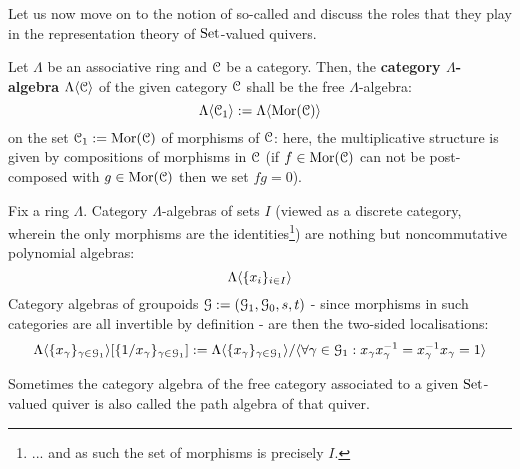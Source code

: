             Let us now move on to the notion of so-called  and discuss the roles that they play in the representation theory of $\mathrm{Set}$-valued quivers. 
            \begin{definition} \label{def: category_algebras}
                Let $\Lambda$ be an associative ring and $\mathcal{C}$ be a category. Then, the \textbf{category $\Lambda$-algebra} $\Lambda\langle\mathcal{C}\rangle$ of the given category $\mathcal{C}$ shall be the free $\Lambda$-algebra:
                    $$\Lambda\langle\mathcal{C}_1\rangle := \Lambda\langle\mathrm{Mor}(\mathcal{C})\rangle$$
                on the set $\mathcal{C}_1 := \mathrm{Mor}(\mathcal{C})$ of morphisms of $\mathcal{C}$: here, the multiplicative structure is given by compositions of morphisms in $\mathcal{C}$ (if $f\in \mathrm{Mor}(\mathcal{C})$ can not be post-composed with $g \in \mathrm{Mor}(\mathcal{C})$ then we set $fg = 0$).
            \end{definition}
            \begin{example}
                Fix a ring $\Lambda$. Category $\Lambda$-algebras of sets $I$ (viewed as a discrete category, wherein the only morphisms are the identities\footnote{... and as such the set of morphisms is precisely $I$.}) are nothing but noncommutative polynomial algebras:
                    $$\Lambda\langle\{x_i\}_{i \in I}\rangle$$
                Category algebras of groupoids $\mathcal{G} := (\mathcal{G}_1, \mathcal{G}_0, s, t)$ - since morphisms in such categories are all invertible by definition - are then the two-sided localisations:
                    $$\Lambda\langle\{x_{\gamma}\}_{\gamma \in \mathcal{G}_1}\rangle[\{1/x_\gamma\}_{\gamma \in \mathcal{G}_1}] := \Lambda\langle\{x_\gamma\}_{\gamma \in \mathcal{G}_1}\rangle/\langle\forall \gamma \in \mathcal{G}_1: x_{\gamma} x_{\gamma}^{-1} = x_{\gamma}^{-1} x_{\gamma} = 1\rangle$$
            \end{example}
            \begin{convention}
                Sometimes the category algebra of the free category associated to a given $\mathrm{Set}$-valued quiver is also called the path algebra of that quiver.
            \end{convention}
